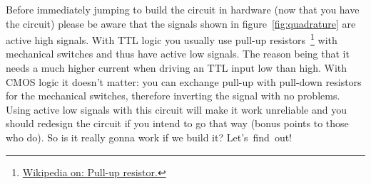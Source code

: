 \documentclass[a4paper]{article}
\begin{document}
Before immediately jumping to build the circuit in hardware (now that you have the circuit) please be aware that the signals shown in figure~\ref{fig:quadrature} are active high signals.
With TTL logic you usually use pull-up resistors~\footnote{\href{https://en.wikipedia.org/wiki/Pull-up_resistor}{Wikipedia on: Pull-up resistor.}} with mechanical switches and thus have active low signals.
The reason being that it needs a much higher current when driving an TTL input low than high.
With CMOS logic it doesn't matter: you can exchange pull-up with pull-down resistors for the mechanical switches, therefore inverting the signal with no problems.
Using active low signals with this circuit will make it work unreliable and you should redesign the circuit if you intend to go that way (bonus points to those who do).
So is it really gonna work if we build it? Let's~find~out!
\newpage
\end{document}
